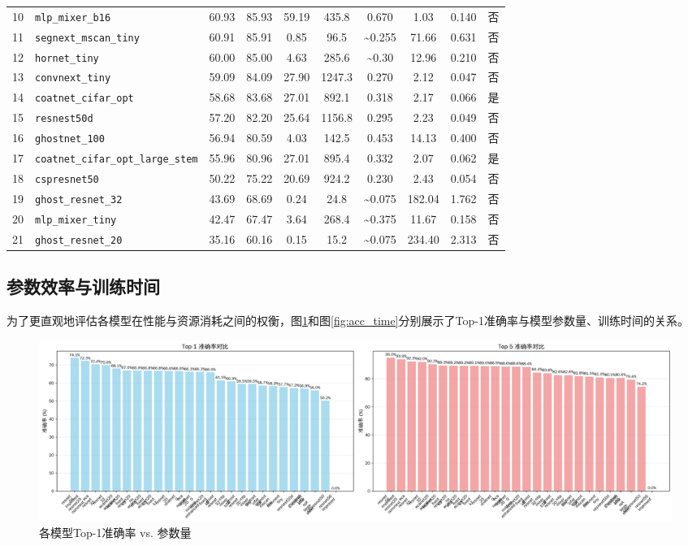 \documentclass[a4paper]{article}
\begin{document}
\begin{table}[H]
{\begin{tabular}{c|l|c|c|c|c|c|c|c|c}
        10 & \texttt{mlp\_mixer\_b16} & 60.93 & 85.93 & 59.19 & 435.8 & 0.670 & 1.03 & 0.140 & 否 \\
        11 & \texttt{segnext\_mscan\_tiny} & 60.91 & 85.91 & 0.85 & 96.5 & \textasciitilde0.255 & 71.66 & 0.631 & 否 \\
        12 & \texttt{hornet\_tiny} & 60.00 & 85.00 & 4.63 & 285.6 & \textasciitilde0.30 & 12.96 & 0.210 & 否 \\
        13 & \texttt{convnext\_tiny} & 59.09 & 84.09 & 27.90 & 1247.3 & 0.270 & 2.12 & 0.047 & 否 \\
        14 & \texttt{coatnet\_cifar\_opt} & 58.68 & 83.68 & 27.01 & 892.1 & 0.318 & 2.17 & 0.066 & 是 \\
        15 & \texttt{resnest50d} & 57.20 & 82.20 & 25.64 & 1156.8 & 0.295 & 2.23 & 0.049 & 否 \\
        16 & \texttt{ghostnet\_100} & 56.94 & 80.59 & 4.03 & 142.5 & 0.453 & 14.13 & 0.400 & 否 \\
        17 & \texttt{coatnet\_cifar\_opt\_large\_stem} & 55.96 & 80.96 & 27.01 & 895.4 & 0.332 & 2.07 & 0.062 & 是 \\
        18 & \texttt{cspresnet50} & 50.22 & 75.22 & 20.69 & 924.2 & 0.230 & 2.43 & 0.054 & 否 \\
        19 & \texttt{ghost\_resnet\_32} & 43.69 & 68.69 & 0.24 & 24.8 & \textasciitilde0.075 & 182.04 & 1.762 & 否 \\
        20 & \texttt{mlp\_mixer\_tiny} & 42.47 & 67.47 & 3.64 & 268.4 & \textasciitilde0.375 & 11.67 & 0.158 & 否 \\
        21 & \texttt{ghost\_resnet\_20} & 35.16 & 60.16 & 0.15 & 15.2 & \textasciitilde0.075 & 234.40 & 2.313 & 否 \\
        \bottomrule
    \end{tabular}%
    }
\end{table}

\subsection{参数效率与训练时间}
为了更直观地评估各模型在性能与资源消耗之间的权衡，图\ref{fig:acc_params}和图\ref{fig:acc_time}分别展示了Top-1准确率与模型参数量、训练时间的关系。

\begin{figure}[H]
    \centering
    \includegraphics[width=\textwidth]{fig/accuracy_comparison.png}
    \caption{各模型Top-1准确率 vs. 参数量}
    \label{fig:acc_params}
\end{figure}
\end{document}
